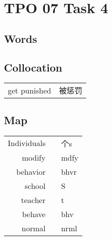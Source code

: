 \section{TPO 07 Task 4}

\subsection{Words}

\subsection{Collocation}

\begin{tabular}{ll}
    get punished & 被惩罚 \\
\end{tabular}

\subsection{Map}

\begin{tabular}{rc@{\quad$\to$\quad}l}
    Individuals &  & 个s              \\
    modify      &  & mdfy            \\
    behavior    &  & bhvr            \\
    school      &  & \textcircled{S} \\
    teacher     &  & t               \\
    behave      &  & bhv             \\
    normal      &  & nrml            \\
\end{tabular}
